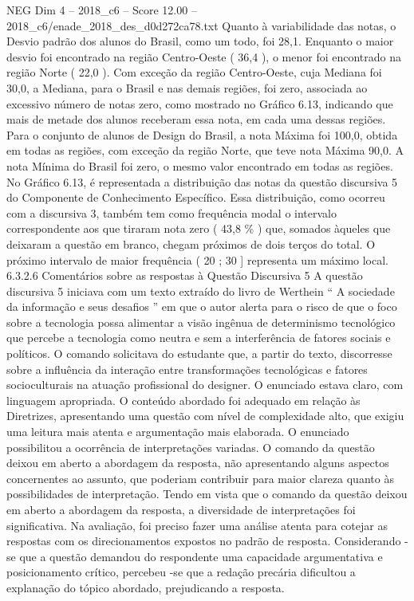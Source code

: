 \begin{textsample}{NEG Dim 4 – 2018\_c6 – Score 12.00 – 2018\_c6/enade\_2018\_des\_d0d272ca78.txt}
Quanto à variabilidade das notas, o Desvio padrão dos alunos do Brasil, como um todo, foi 28,1.
Enquanto o maior desvio foi encontrado na região Centro-Oeste ( 36,4 ), o menor foi encontrado na região Norte ( 22,0 ).
Com exceção da região Centro-Oeste, cuja Mediana foi 30,0, a Mediana, para o Brasil e nas demais regiões, foi zero, associada ao excessivo número de notas zero, como mostrado no Gráfico 6.13, indicando que mais de metade dos alunos receberam essa nota, em cada uma dessas regiões.
Para o conjunto de alunos de Design do Brasil, a nota Máxima foi 100,0, obtida em todas as regiões, com exceção da região Norte, que teve nota Máxima 90,0.
A nota Mínima do Brasil foi zero, o mesmo valor encontrado em todas as regiões.
No Gráfico 6.13, é representada a distribuição das notas da questão discursiva 5 do Componente de Conhecimento Específico.
Essa distribuição, como ocorreu com a discursiva 3, também tem como frequência modal o intervalo correspondente aos que tiraram nota zero ( 43,8 \% ) que, somados àqueles que deixaram a questão em branco, chegam próximos de dois terços do total.
O próximo intervalo de maior frequência ( 20 ; 30 ] representa um máximo local. 6.3.2.6 Comentários sobre as respostas à Questão Discursiva 5 A questão discursiva 5 iniciava com um texto extraído do livro de Werthein “ A sociedade da informação e seus desafios ” em que o autor alerta para o risco de que o foco sobre a tecnologia possa alimentar a visão ingênua de determinismo tecnológico que percebe a tecnologia como neutra e sem a interferência de fatores sociais e políticos.
O comando solicitava do estudante que, a partir do texto, discorresse sobre a influência da interação entre transformações tecnológicas e fatores socioculturais na atuação profissional do designer.
O enunciado estava claro, com linguagem apropriada.
O conteúdo abordado foi adequado em relação às Diretrizes, apresentando uma questão com nível de complexidade alto, que exigiu uma leitura mais atenta e argumentação mais elaborada.
O enunciado possibilitou a ocorrência de interpretações variadas.
O comando da questão deixou em aberto a abordagem da resposta, não apresentando alguns aspectos concernentes ao assunto, que poderiam contribuir para maior clareza quanto às possibilidades de interpretação.
Tendo em vista que o comando da questão deixou em aberto a abordagem da resposta, a diversidade de interpretações foi significativa.
Na avaliação, foi preciso fazer uma análise atenta para cotejar as respostas com os direcionamentos expostos no padrão de resposta.
Considerando -se que a questão demandou do respondente uma capacidade argumentativa e posicionamento crítico, percebeu -se que a redação precária dificultou a explanação do tópico abordado, prejudicando a resposta.

\end{textsample}

